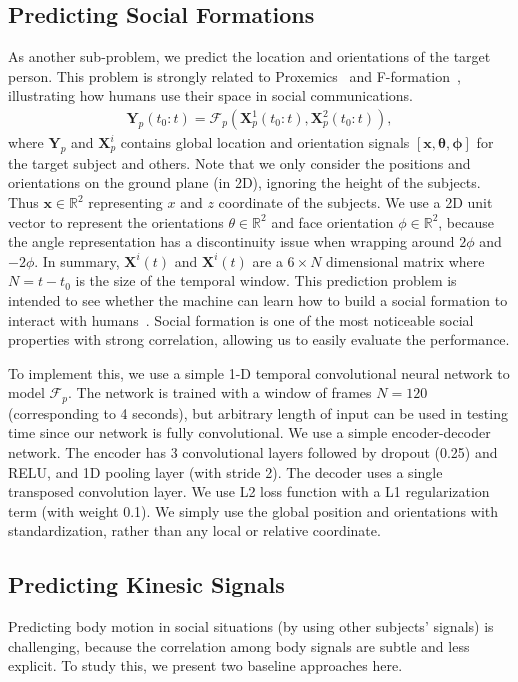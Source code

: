 \subsection{Predicting Social Formations}
As another sub-problem, we predict the location and orientations of the target person. This problem is strongly related to Proxemics~\cite{Hall66} and F-formation~\cite{kendon90}, illustrating how humans use their space in social communications.
\begin{gather}	
 \mathbf{Y}_p (t_0:t) = \mathcal{F}_p ( \mathbf{X}_p^1(t_0:t), \mathbf{X}_p^2(t_0:t)),
 \label{eq:pred_formation}
\end{gather}
where $\mathbf{Y}_p$ and $\mathbf{X}_p^i$ contains global location and orientation signals $[\mathbf{x}, \mathbf{\theta}, \mathbf{\phi} ]$ for the target subject and others.
Note that we only consider the positions and orientations on the ground plane (in 2D), ignoring the height of the subjects. Thus $\mathbf{x} \in \mathbb{R}^2 $ representing $x$ and $z$ coordinate of the subjects. We use a 2D unit vector to represent the orientations $\theta \in \mathbb {R}^2$ and face orientation $\phi \in \mathbb{R}^2$, because the angle representation has a discontinuity issue when wrapping around $2\phi$ and $-2\phi$. In summary, $\mathbf{X}^i(t)$ and $\mathbf{X}^i(t)$ are a $6 \times N$ dimensional matrix where $N = t- t_0$ is the size of the temporal window. This prediction problem is intended to see whether the machine can learn how to build a social formation to interact with humans~\cite{vazquez2017towards}. Social formation is one of the most noticeable social properties with strong correlation, allowing us to easily evaluate the performance.


To implement this, we use a simple 1-D temporal convolutional neural network to model $\mathcal{F}_p$. The network is trained with a window of frames $N=120$ (corresponding to 4 seconds), but arbitrary length of input can be used in testing time since our network is fully convolutional. We use a simple encoder-decoder network. The encoder has  3 convolutional layers followed by dropout (0.25) and RELU, and 1D pooling layer (with stride 2). The decoder uses a single transposed convolution layer. We use L2 loss function with a L1 regularization term (with weight 0.1). We simply use the global position and orientations with standardization, rather than any local or relative coordinate.

\subsection{Predicting Kinesic Signals}
Predicting body motion in social situations (by using other subjects' signals) is challenging, because the correlation among body signals are subtle and less explicit. To study this, we present two baseline approaches here. 

